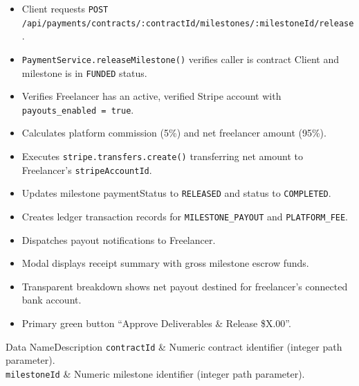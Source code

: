 \begin{itemize}[leftmargin=1.6em,topsep=3pt,itemsep=2pt,parsep=0pt,label=$\bullet$]
      \item Client requests \texttt{POST /\allowbreak{}api/\allowbreak{}payments/\allowbreak{}contracts/\allowbreak{}:\allowbreak{}contractId/\allowbreak{}milestones/\allowbreak{}:\allowbreak{}milestoneId/\allowbreak{}release}.
      \item \texttt{PaymentService.\allowbreak{}release\allowbreak{}Milestone()} verifies caller is contract Client and milestone is in \texttt{FUNDED} status.
      \item Verifies Freelancer has an active, verified Stripe account with \texttt{payouts\_\allowbreak{}enabled = true}.
      \item Calculates platform commission (5\%) and net freelancer amount (95\%).
      \item Executes \texttt{stripe.transfers.create()} transferring net amount to Freelancer's \texttt{stripeAccountId}.
      \item Updates milestone paymentStatus to \texttt{RELEASED} and status to \texttt{COMPLETED}.
      \item Creates ledger transaction records for \texttt{MILESTONE\_PAYOUT} and \texttt{PLATFORM\_FEE}.
      \item Dispatches payout notifications to Freelancer.
\end{itemize}

\begin{itemize}[leftmargin=1.6em,topsep=3pt,itemsep=2pt,parsep=0pt,label=$\bullet$]
      \item Modal displays receipt summary with gross milestone escrow funds.
      \item Transparent breakdown shows net payout destined for freelancer's connected bank account.
      \item Primary green button ``Approve Deliverables \& Release \$X.00''.
\end{itemize}


\begin{specdatatable}{Data Name}{Description}
      \texttt{contractId} & Numeric contract identifier (integer path parameter).\\ \hline
      \texttt{milestoneId} & Numeric milestone identifier (integer path parameter).\\ \hline
\end{specdatatable}

